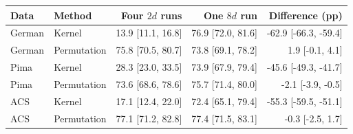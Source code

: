 \begin{tabular}{llrrr}
\toprule
Data & Method & Four $2d$ runs & One $8d$ run & Difference (pp) \\
\midrule
German & Kernel & 13.9 [11.1, 16.8] & 76.9 [72.0, 81.6] & -62.9 [-66.3, -59.4] \\
German & Permutation & 75.8 [70.5, 80.7] & 73.8 [69.1, 78.2] & 1.9 [-0.1, 4.1] \\
Pima & Kernel & 28.3 [23.0, 33.5] & 73.9 [67.9, 79.4] & -45.6 [-49.3, -41.7] \\
Pima & Permutation & 73.6 [68.6, 78.6] & 75.7 [71.4, 80.0] & -2.1 [-3.9, -0.5] \\
ACS & Kernel & 17.1 [12.4, 22.0] & 72.4 [65.1, 79.4] & -55.3 [-59.5, -51.1] \\
ACS & Permutation & 77.1 [71.2, 82.8] & 77.4 [71.5, 83.1] & -0.3 [-2.5, 1.7] \\
\bottomrule
\end{tabular}